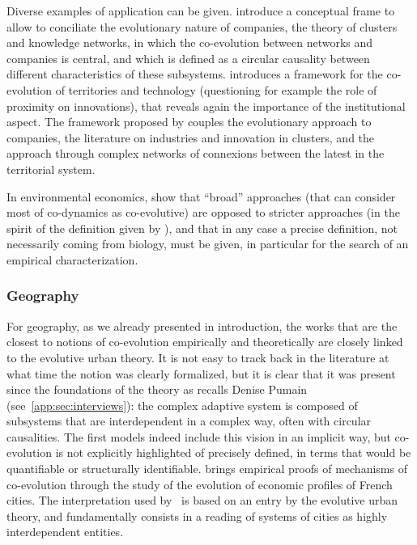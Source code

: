 \documentclass[letterpaper]{article}
\begin{document}
Diverse examples of application can be given. \cite{doi:10.1080/00343400802662658} introduce a conceptual frame to allow to conciliate the evolutionary nature of companies, the theory of clusters and knowledge networks, in which the co-evolution between networks and companies  is central, and which is defined as a circular causality between different characteristics of these subsystems. \cite{colletis2010co} introduces a framework for the co-evolution of territories and technology (questioning for example the role of proximity on innovations), that reveals again the importance of the institutional aspect. The framework proposed by \cite{ter2011co} couples the evolutionary approach to companies, the literature on industries and innovation in clusters, and the approach through complex networks of connexions between the latest in the territorial system.

In environmental economics, \cite{kallis2007coevolution} show that ``broad'' approaches (that can consider most of co-dynamics as co-evolutive) are opposed to stricter approaches (in the spirit of the definition given by \cite{schamp201020}), and that in any case a precise definition, not necessarily coming from biology, must be given, in particular for the search of an empirical characterization.

\subsubsection{Geography}

For geography, as we already presented in introduction, the works that are the closest to notions of co-evolution empirically and theoretically are closely linked to the evolutive urban theory. It is not easy to track back in the literature at what time the notion was clearly formalized, but it is clear that it was present since the foundations of the theory as recalls Denise Pumain (see~\ref{app:sec:interviews}): the complex adaptive system is composed of subsystems that are interdependent in a complex way, often with circular causalities. The first models indeed include this vision in an implicit way, but co-evolution is not explicitly highlighted of precisely defined, in terms that would be quantifiable or structurally identifiable. \cite{paulus2004coevolution} brings empirical proofs of mechanisms of co-evolution through the study of the evolution of economic profiles of French cities. The interpretation used by~\cite{schmitt2014modelisation} is based on an entry by the evolutive urban theory, and fundamentally consists in a reading of systems of cities as highly interdependent entities.
\end{document}
